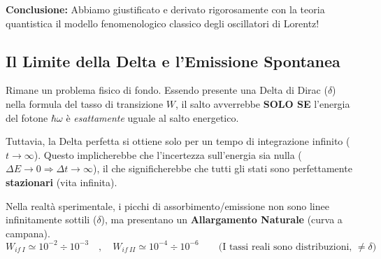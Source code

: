 \documentclass[11pt, a4paper]{article}
\begin{document}
\begin{table}[htbp]
\centering
{}
\end{table}

\noindent
\textbf{Conclusione:} Abbiamo giustificato e derivato rigorosamente con la teoria quantistica il modello fenomenologico classico degli oscillatori di Lorentz! %

\subsection{Il Limite della Delta e l'Emissione Spontanea} %

Rimane un problema fisico di fondo. Essendo presente una Delta di Dirac ($\delta$) nella formula del tasso di transizione $W$, il salto avverrebbe \textbf{SOLO SE} l'energia del fotone $\hbar\omega$ è \textit{esattamente} uguale al salto energetico. %

\noindent
Tuttavia, la Delta perfetta si ottiene solo per un tempo di integrazione infinito ($t \to \infty$). Questo implicherebbe che l'incertezza sull'energia sia nulla ($\Delta E \to 0 \Rightarrow \Delta t \to \infty$), il che significherebbe che tutti gli stati sono perfettamente \textbf{stazionari} (vita infinita). %

\noindent
Nella realtà sperimentale, i picchi di assorbimento/emissione non sono linee infinitamente sottili ($\delta$), ma presentano un \textbf{Allargamento Naturale} (curva a campana). %
\begin{equation*}
    W_{if\ I} \simeq 10^{-2} \div 10^{-3} \quad , \quad W_{if\ II} \simeq 10^{-4} \div 10^{-6} \qquad \text{(I tassi reali sono distribuzioni, } \neq \delta) %
\end{equation*}
\end{document}

